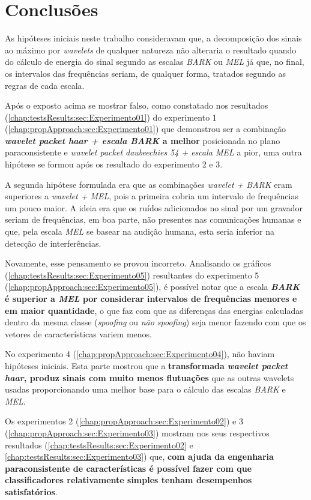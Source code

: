 \chapter{Conclusões}
\label{chap:conclusions}
	\par As hipóteses iniciais neste trabalho consideravam que, a decomposição dos sinais ao máximo por \textit{wavelets} de qualquer natureza não alteraria o resultado quando do cálculo de energia do sinal segundo as escalas \textit{BARK} ou \textit{MEL} já que, no final, os intervalos das frequências seriam, de qualquer forma, tratados segundo as regras de cada escala.
	\par Após o exposto acima se mostrar falso, como constatado nos resultados (\ref{chap:testsResults:sec:Experimento01}) do experimento 1  (\ref{chap:propApproach:sec:Experimento01}) que demonstrou ser a combinação \textbf{\textit{wavelet packet haar + escala BARK} a melhor} posicionada no plano paraconsistente e \textit{wavelet packet daubeechies 54 + escala MEL} a pior, uma outra hipótese se formou após os resultado do experimento 2 e 3.
	\par A segunda hipótese formulada era que as combinações \textit{wavelet + BARK} eram superiores a \textit{wavelet + MEL}, pois a primeira cobria um intervalo de frequências um pouco maior. A ideia era que os ruídos adicionados no sinal por um gravador seriam de frequências, em boa parte, não presentes nas comunicações humanas e que, pela escala \textit{MEL} se basear na audição humana, esta seria inferior na detecção de interferências.
	\par Novamente, esse pensamento se provou incorreto. Analisando os gráficos (\ref{chap:testsResults:sec:Experimento05}) resultantes do experimento 5 (\ref{chap:propApproach:sec:Experimento05}), é possível notar que a escala \textbf{\textit{BARK} é superior a \textit{MEL} por considerar intervalos de frequências menores e em maior quantidade}, o que faz com que as diferenças das energias calculadas dentro da mesma classe (\textit{spoofing} ou \textit{não spoofing}) seja menor fazendo com que os vetores de características variem menos.
	\par No experimento 4 (\ref{chap:propApproach:sec:Experimento04}), não haviam hipóteses iniciais. Esta parte mostrou que a \textbf{transformada \textit{wavelet packet haar}, produz sinais com muito menos flutuações} que as outras wavelets usadas proporcionando uma melhor base para o cálculo das escalas \textit{BARK} e \textit{MEL}.
	\par Os experimentos 2 (\ref{chap:propApproach:sec:Experimento02}) e 3 (\ref{chap:propApproach:sec:Experimento03}) mostram nos seus respectivos resultados (\ref{chap:testsResults:sec:Experimento02} e \ref{chap:testsResults:sec:Experimento03}) que, \textbf{com ajuda da engenharia paraconsistente de características é possível fazer com que classificadores relativamente simples tenham desempenhos satisfatórios}.